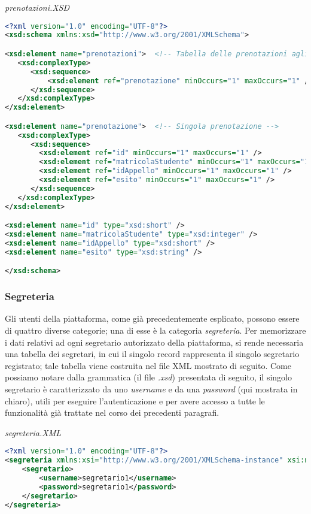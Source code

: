 \documentclass [a4paper,11pt]{book}
\begin{document}
\emph{prenotazioni.XSD}

\begin{lstlisting}[language=XML]
<?xml version="1.0" encoding="UTF-8"?>
<xsd:schema xmlns:xsd="http://www.w3.org/2001/XMLSchema">

<xsd:element name="prenotazioni">  <!-- Tabella delle prenotazioni agli appelli -->
   <xsd:complexType> 
      <xsd:sequence>
	      <xsd:element ref="prenotazione" minOccurs="1" maxOccurs="1" />
      </xsd:sequence>
   </xsd:complexType>
</xsd:element>

<xsd:element name="prenotazione">  <!-- Singola prenotazione -->
   <xsd:complexType> 
      <xsd:sequence>
        <xsd:element ref="id" minOccurs="1" maxOccurs="1" /> 
        <xsd:element ref="matricolaStudente" minOccurs="1" maxOccurs="1" />
        <xsd:element ref="idAppello" minOccurs="1" maxOccurs="1" /> 
        <xsd:element ref="esito" minOccurs="1" maxOccurs="1" /> 
      </xsd:sequence>
   </xsd:complexType>
</xsd:element>

<xsd:element name="id" type="xsd:short" />
<xsd:element name="matricolaStudente" type="xsd:integer" />
<xsd:element name="idAppello" type="xsd:short" />
<xsd:element name="esito" type="xsd:string" />

</xsd:schema>
\end{lstlisting}

\medskip

\subsubsection{Segreteria}

Gli utenti della piattaforma, come già precedentemente esplicato, possono essere di quattro diverse categorie; una di esse è la categoria \emph{segreteria}. Per memorizzare i dati relativi ad ogni segretario autorizzato della piattaforma, si rende necessaria una tabella dei segretari, in cui il singolo record rappresenta il singolo segretario registrato; tale tabella viene costruita nel file XML mostrato di seguito. Come possiamo notare dalla grammatica (il file \emph{.xsd}) presentata di seguito, il singolo segretario è caratterizzato da uno \emph{username} e da una \emph{password} (qui mostrata in chiaro), utili per eseguire l'autenticazione e per avere accesso a tutte le funzionalità già trattate nel corso dei precedenti paragrafi.

\medskip

\emph{segreteria.XML}

\begin{lstlisting}[language=XML]
<?xml version="1.0" encoding="UTF-8"?>
<segreteria xmlns:xsi="http://www.w3.org/2001/XMLSchema-instance" xsi:noNamespaceSchemaLocation="segreteria.xsd">
    <segretario>
        <username>segretario1</username>
        <password>segretario1</password>
    </segretario>
</segreteria>
\end{lstlisting}
\end{document}
